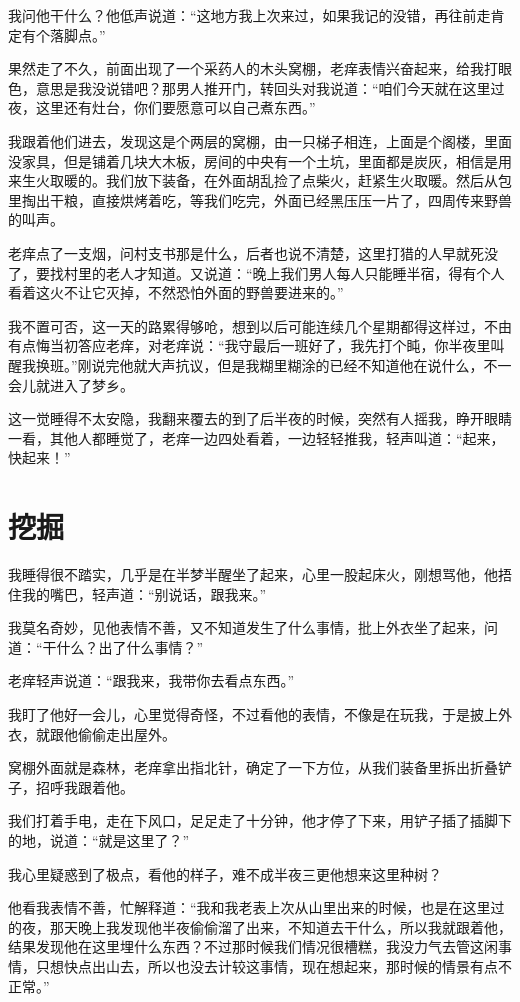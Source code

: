 我问他干什么？他低声说道：“这地方我上次来过，如果我记的没错，再往前走肯定有个落脚点。”

果然走了不久，前面出现了一个采药人的木头窝棚，老痒表情兴奋起来，给我打眼色，意思是我没说错吧？那男人推开门，转回头对我说道：“咱们今天就在这里过夜，这里还有灶台，你们要愿意可以自己煮东西。”

我跟着他们进去，发现这是个两层的窝棚，由一只梯子相连，上面是个阁楼，里面没家具，但是铺着几块大木板，房间的中央有一个土坑，里面都是炭灰，相信是用来生火取暖的。我们放下装备，在外面胡乱捡了点柴火，赶紧生火取暖。然后从包里掏出干粮，直接烘烤着吃，等我们吃完，外面已经黑压压一片了，四周传来野兽的叫声。

老痒点了一支烟，问村支书那是什么，后者也说不清楚，这里打猎的人早就死没了，要找村里的老人才知道。又说道：“晚上我们男人每人只能睡半宿，得有个人看着这火不让它灭掉，不然恐怕外面的野兽要进来的。”

我不置可否，这一天的路累得够呛，想到以后可能连续几个星期都得这样过，不由有点悔当初答应老痒，对老痒说：“我守最后一班好了，我先打个盹，你半夜里叫醒我换班。”刚说完他就大声抗议，但是我糊里糊涂的已经不知道他在说什么，不一会儿就进入了梦乡。

这一觉睡得不太安隐，我翻来覆去的到了后半夜的时候，突然有人摇我，睁开眼睛一看，其他人都睡觉了，老痒一边四处看着，一边轻轻推我，轻声叫道：“起来，快起来！”

\chapter{挖掘}

我睡得很不踏实，几乎是在半梦半醒坐了起来，心里一股起床火，刚想骂他，他捂住我的嘴巴，轻声道：“别说话，跟我来。”

我莫名奇妙，见他表情不善，又不知道发生了什么事情，批上外衣坐了起来，问道：“干什么？出了什么事情？”

老痒轻声说道：“跟我来，我带你去看点东西。”

我盯了他好一会儿，心里觉得奇怪，不过看他的表情，不像是在玩我，于是披上外衣，就跟他偷偷走出屋外。

窝棚外面就是森林，老痒拿出指北针，确定了一下方位，从我们装备里拆出折叠铲子，招呼我跟着他。

我们打着手电，走在下风口，足足走了十分钟，他才停了下来，用铲子插了插脚下的地，说道：“就是这里了？”

我心里疑惑到了极点，看他的样子，难不成半夜三更他想来这里种树？

他看我表情不善，忙解释道：“我和我老表上次从山里出来的时候，也是在这里过的夜，那天晚上我发现他半夜偷偷溜了出来，不知道去干什么，所以我就跟着他，结果发现他在这里埋什么东西？不过那时候我们情况很槽糕，我没力气去管这闲事情，只想快点出山去，所以也没去计较这事情，现在想起来，那时候的情景有点不正常。”


